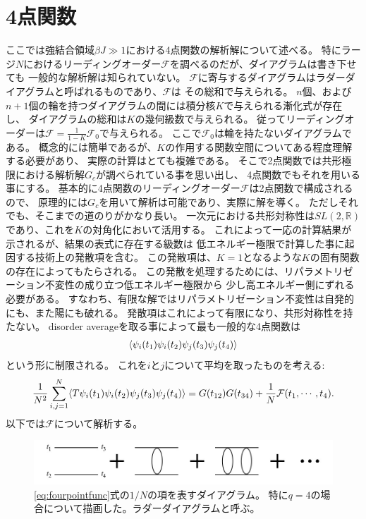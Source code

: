 \section{4点関数\label{sec:fourpointfunc}}
ここでは強結合領域$\beta J \gg 1$における4点関数の解析解について述べる。
特にラージ$N$におけるリーディングオーダー$\mathcal{F}$を調べるのだが、ダイアグラムは書き下せても
一般的な解析解は知られていない。
$\mathcal{F}$に寄与するダイアグラムはラダーダイアグラムと呼ばれるものであり、$\mathcal{F}$は
その総和で与えられる。
$n$個、および$n+1$個の輪を持つダイアグラムの間には積分核$K$で与えられる漸化式が存在し、
ダイアグラムの総和は$K$の幾何級数で与えられる。
従ってリーディングオーダーは$\mathcal{F} = \frac{1}{1-K}\mathcal{F}_0$で与えられる。
ここで$\mathcal{F}_0$は輪を持たないダイアグラムである。
概念的には簡単であるが、$K$の作用する関数空間についてある程度理解する必要があり、
実際の計算はとても複雑である。
そこで2点関数では共形極限における解析解$G_c$が調べられている事を思い出し、
4点関数でもそれを用いる事にする。
基本的に4点関数のリーディングオーダー$\mathcal{F}$は2点関数で構成されるので、
原理的には$G_c$を用いて解析は可能であり、実際に解を導く。
ただしそれでも、そこまでの道のりがかなり長い。
一次元における共形対称性は$SL(2, \mathbb{R})$であり、これを$K$の対角化において活用する。
これによって一応の計算結果が示されるが、結果の表式に存在する級数は
低エネルギー極限で計算した事に起因する技術上の発散項を含む。
この発散項は、$K = 1$となるような$K$の固有関数の存在によってもたらされる。
この発散を処理するためには、リパラメトリゼーション不変性の成り立つ低エネルギー極限から
少し高エネルギー側にずれる必要がある。
すなわち、有限な解ではリパラメトリゼーション不変性は自発的にも、また陽にも破れる。
発散項はこれによって有限になり、共形対称性を持たない。
disorder averageを取る事によって最も一般的な4点関数は
\begin{align}
	\langle \psi_i(t_1)\psi_i(t_2)\psi_j(t_3)\psi_j(t_4) \rangle
\end{align}
という形に制限される。
これを$i$と$j$について平均を取ったものを考える:
\begin{align}
	\frac{1}{N^2}\sum_{i,j=1}^{N}\langle T\psi_i(t_1)\psi_i(t_2)\psi_j(t_3)\psi_j(t_4) \rangle
	= G(t_{12})G(t_{34}) + \frac{1}{N}\mathcal{F}(t_1, \cdots, t_4).
	\label{eq:fourpointfunc}
\end{align}
以下では$\mathcal{F}$について解析する。

\begin{figure}[h]
	\centering
	\vspace{1cm}
	\includegraphics[width=13cm]{figures/ladderDiagram}
	\caption{\eqref{eq:fourpointfunc}式の$1/N$の項を表すダイアグラム。
		特に$q=4$の場合について描画した。ラダーダイアグラムと呼ぶ。}
	\label{fig:ladderdiagram}
\end{figure}

